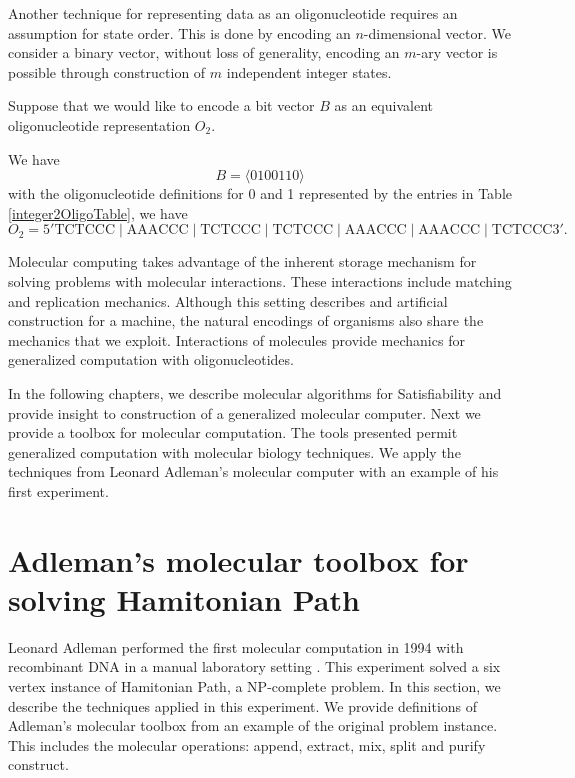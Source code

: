 Another technique for representing data as an oligonucleotide requires an assumption for state order.  This is done by encoding an $n$-dimensional vector.  We consider a binary vector, without loss of generality, encoding an $m$-ary vector is possible through construction of $m$ independent integer states.

Suppose that we would like to encode a bit vector $B$ as an equivalent oligonucleotide representation $O_2$.

We have 
\[
B = \langle 0100110 \rangle
\]
with the oligonucleotide definitions for 0 and 1 represented by the entries in Table \ref{integer2OligoTable}, we have
\[
O_2 = 5'\text{TCTCCC}\mid \text{AAACCC}\mid \text{TCTCCC}\mid \text{TCTCCC}\mid \text{AAACCC}\mid \text{AAACCC}\mid \text{TCTCCC}3'.
\]


Molecular computing takes advantage of the inherent storage mechanism for solving problems with molecular interactions.  These interactions include matching and replication mechanics.  Although this setting describes and artificial construction for a machine, the natural encodings of organisms also share the mechanics that we exploit.  Interactions of molecules provide mechanics for generalized computation with oligonucleotides.
	
In the following chapters, we describe molecular algorithms for {\sc Satisfiability} and provide insight to construction of a generalized molecular computer.  Next we provide a toolbox for molecular computation.  The tools presented permit generalized computation with molecular biology techniques.  We apply the techniques from Leonard Adleman's molecular computer with an example of his first experiment.

\section{Adleman's molecular toolbox for solving {\sc Hamitonian Path}}
	
Leonard Adleman performed the first molecular computation in 1994 with recombinant DNA in a manual laboratory setting \cite{Adleman:1994:MCS:189441.189442}.  This experiment solved a six vertex instance of {\sc Hamitonian Path}, a \textsf{NP-complete} problem.  In this section, we describe the techniques applied in this experiment. We provide  definitions of Adleman's molecular toolbox from an example of the original problem instance.  This includes the molecular operations: append, extract, mix, split and purify construct.

